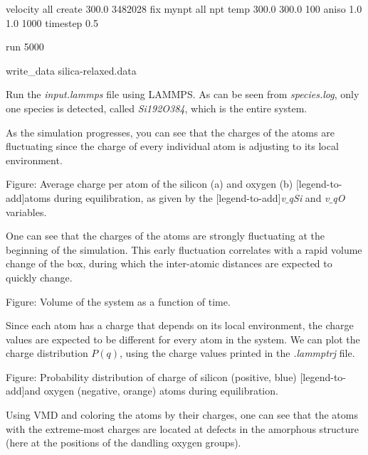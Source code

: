 \begin{lcverbatim}
velocity all create 300.0 3482028
fix mynpt all npt temp 300.0 300.0 100 aniso 1.0 1.0 1000
timestep 0.5

run 5000

write_data silica-relaxed.data
\end{lcverbatim}

\noindent Run the \textit{input.lammps} file using LAMMPS. As can be seen from \textit{species.log},
only one species is detected, called \textit{Si192O384}, which is the entire system.

\vspace{0.25cm} \noindent As the simulation progresses, you can see that the charges of the atoms are fluctuating
since the charge of every individual atom is adjusting to its local environment.

\vspace{0.25cm} Figure: Average charge per atom of the silicon (a) and oxygen (b)
[legend-to-add]atoms during equilibration, as given by the
[legend-to-add]\textit{v$\_$qSi} and \textit{v$\_$qO} variables.

\vspace{0.25cm} \noindent One can see that the charges of the atoms are strongly fluctuating
at the beginning of the simulation. This early fluctuation correlates
with a rapid volume change of the box, during which
the inter-atomic distances are expected to quickly change.

\vspace{0.25cm} Figure: Volume of the system as a function of time.

\vspace{0.25cm} \noindent Since each atom has a charge that depends on its local environment,
the charge values are expected to be different for every atom in the system.
We can plot the charge distribution $P(q)$, using the charge values
printed in the \textit{.lammptrj} file. 

\vspace{0.25cm} Figure: Probability distribution of charge of silicon (positive, blue)
[legend-to-add]and oxygen (negative, orange) atoms during equilibration.

\vspace{0.25cm} \noindent Using VMD and coloring the atoms by their charges, one can see that 
the atoms with the extreme-most charges are located at defects in the 
amorphous structure (here at the positions of the dandling oxygen groups).

